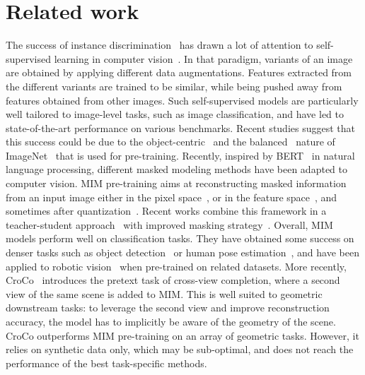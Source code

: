\documentclass[10pt,twocolumn,letterpaper]{article}
\newcommand{\PAR}[1]{\noindent{\bf{#1.}}}
\begin{document}
\section{Related work}
\label{sec:related}

\PAR{Self-supervised learning}
The success of instance discrimination~\cite{swav,dino,simclr,byol,moco} has drawn a lot of attention to self-supervised learning in computer vision~\cite{JingPAMI21SelfSupervisedVisualFeatureLearningDeepSurvey}.
In that paradigm, variants of an image are obtained by applying different data augmentations. Features extracted from the different variants are trained to be similar, while being pushed away from features obtained from other images.
Such self-supervised models are particularly well tailored to image-level tasks, such as image classification, and have led to state-of-the-art performance on various benchmarks.
Recent studies suggest that this success could be due to the object-centric~\cite{purushwalkam2020demystifying} and the balanced~\cite{assran2022hidden} nature of ImageNet~\cite{imagenet} that is used for pre-training.
Recently, inspired by BERT~\cite{BERT} in natural language processing, different masked modeling methods have been adapted to computer vision. 
MIM pre-training aims at reconstructing masked information from an input image either in the pixel space~\cite{sit,multimae,iGPT,splitmask,mae,SimMIM}, or in the feature space~\cite{msn,data2vec,maskfeat}, and sometimes after quantization~\cite{BEiT,iBOT}.
Recent works combine this framework in a teacher-student approach~\cite{lee2022exploring,MST} with improved masking strategy~\cite{CiM,AttMask,MST}.
Overall, MIM models perform well on classification tasks. They have obtained some success on denser tasks such as object detection~\cite{mae} or human pose estimation~\cite{vitpose}, and have been applied to robotic vision~\cite{maerobot} when pre-trained on related datasets.
More recently, CroCo~\cite{croco} introduces the pretext task of cross-view completion, where a second view of the same scene is added to MIM. This is well suited to geometric downstream tasks: to leverage the second view and improve reconstruction accuracy, the model has to implicitly 
be aware of the geometry of the scene. CroCo outperforms MIM pre-training on an array of geometric tasks. However, it relies on synthetic data only, which may be sub-optimal, and does not reach the performance of the best task-specific methods.
\end{document}
